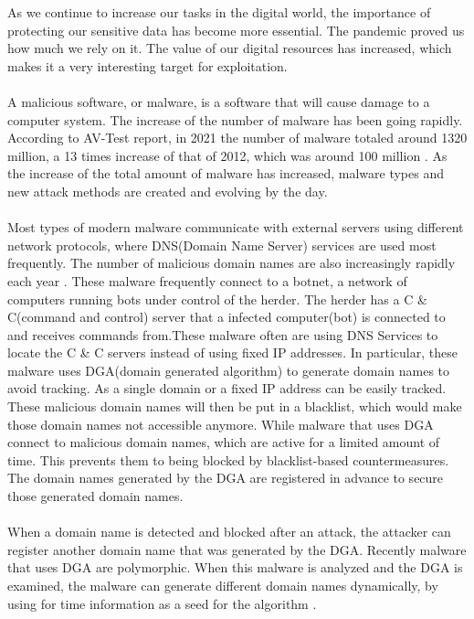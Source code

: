 As we continue to increase our tasks in the digital world, the importance of
protecting our sensitive data has become more essential. The pandemic proved us how much we rely on it. The value of our digital resources has increased, which makes it a very interesting target for exploitation. \\\\
A malicious software, or malware, is a software that will cause damage to a
computer system. The increase of the number of malware has been going rapidly. According to AV-Test report, in 2021 the number of malware totaled around 1320 million, a 13 times increase of that of 2012, which was around 100 million \cite{avtest}. As the increase of the total amount of malware has increased, malware types and
new attack methods are created and evolving by the day.\\\\
Most types of modern malware communicate with external servers using different network protocols, where DNS(Domain Name Server) services are used most frequently. The number of malicious domain names are also increasingly rapidly each year \cite{ist}. These malware frequently connect to a botnet, a network of computers
running bots under control of the herder. The herder has a C \& C(command and control) server that a infected computer(bot) is connected to and receives commands from.These malware often are using DNS Services to locate the C \& C servers instead of using fixed IP addresses. In particular, these malware uses DGA(domain generated algorithm) to generate domain names to avoid tracking. As a single domain or a fixed IP address can be easily tracked. These malicious domain names will then be put in a blacklist, which would make those domain names not accessible anymore. While malware that uses DGA connect to malicious domain names, which are active for a limited amount of time. This prevents them to being blocked by blacklist-based countermeasures. The domain names generated by the DGA are registered in advance to secure those generated domain names.\\\\
When a domain name is detected and blocked after an attack, the attacker can register another domain name that was generated by the DGA. Recently malware that uses DGA are polymorphic. When this malware is analyzed and the DGA is examined, the malware can generate different domain names dynamically, by using for time information as a seed for the algorithm \cite{arntz_2016}.\\\\
